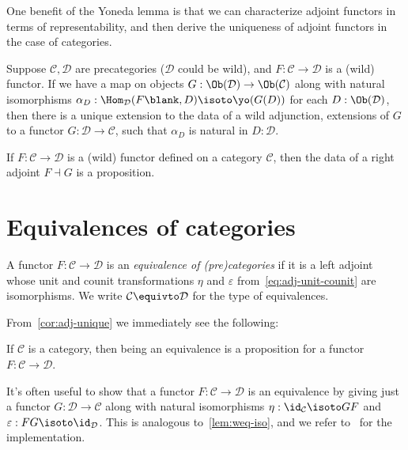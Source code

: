 One benefit of the Yoneda lemma is that we can characterize adjoint functors
in terms of representability, and then derive the uniqueness of adjoint functors
in the case of categories.
\begin{lemma}\label{lem:adj-via-repr}
  Suppose $\mathcal C,\mathcal D$ are precategories ($\mathcal D$ could be wild),
  and $F : \mathcal C \to \mathcal D$ is a (wild) functor.
  If we have a map on objects $G : \Ob(\mathcal D) \to \Ob(\mathcal C)$
  along with natural isomorphisms
  $\alpha_D : \Hom_{\mathcal D}(F\blank, D) \isoto \yo(G(D))$
  for each $D : \Ob(\mathcal D)$, then there is a unique
  extension to the data of a wild adjunction, \ie
  extensions of $G$ to a functor $G : \mathcal D \to \mathcal C$,
  such that $\alpha_D$ is natural in $D:\mathcal D$.
\end{lemma}

\begin{corollary}\label{cor:adj-unique}
  If $F : \mathcal C \to \mathcal D$ is a (wild) functor defined on a category
  $\mathcal C$, then the data of a right adjoint $F \dashv G$ is a proposition.
\end{corollary}

\section{Equivalences of categories}

\begin{definition}\label{def:cat-equiv}
  A functor $F : \mathcal C \to \mathcal D$ is an \emph{equivalence of (pre)categories}%
  if it is a left adjoint whose unit and counit transformations $\eta$ and $\varepsilon$
  from~\eqref{eq:adj-unit-counit} are isomorphisms.
  We write $\mathcal C \equivto \mathcal D$ for
  the type of equivalences.
\end{definition}
From~\cref{cor:adj-unique} we immediately see the following:
\begin{lemma}\label{lem:cat-equiv-is-prop}
  If $\mathcal C$ is a category, then being an equivalence
  is a proposition for a functor $F : \mathcal C \to \mathcal D$.
\end{lemma}
It's often useful to show that a functor $F : \mathcal C \to \mathcal D$ is an equivalence by giving just a functor $G : \mathcal D \to \mathcal C$
along with natural isomorphisms $\eta : \id_{\mathcal C} \isoto GF$
and $\varepsilon : FG \isoto \id_{\mathcal D}$.
This is analogous to~\cref{lem:weq-iso}, and we refer to~\textcite[Lemma~6.2]{AKS2015}
for the implementation.


